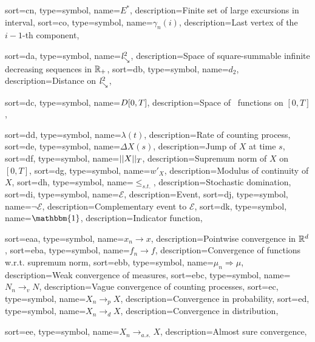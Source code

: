 {
	sort={cn},
	type=symbol,
	name={$E^*$},
	description={Finite set of large excursions in interval, \pageref{L: Deterministic Lemma}}
}
{
	sort={co},
	type=symbol,
name={$\gamma_n(i)$},
description={Last vertex of the $i-1$-th component, \pageref{L: Lemma 8}}
}


{
	sort={da},
	type=symbol,
	name={$\mathit{l}^2_{\searrow}$},
	description={Space of square-summable infinite decreasing sequences in $\mathbb{R}_+$, \pageref{D: ld}}
}
{
	sort={db},
	type=symbol,
	name={$d_2$},
	description={Distance on $\mathit{l}^2_{\searrow}$, \pageref{D: ld}}
}

{
	sort={dc},
	type=symbol,
name={$D[0, T]$},
description={Space of \cadlag~functions on $[0,T]$, \pageref{D: DT}}
}

{
	sort={dd},
	type=symbol,
name={$\lambda(t)$},
description={Rate of counting process, \pageref{D: def gamma(A)}}
}
{
	sort={de},
	type=symbol,
name={$\Delta X(s)$},
description={Jump of $X$ at time $s$, \pageref{I: DeltaX}}
}
{
	sort={df},
	type=symbol,
name={$||X||_T$},
description={Supremum norm of $X$ on $[0,T]$, \pageref{I: supnorm}}
}
{
	sort={dg},
	type=symbol,
	name={$w'_X$},
	description={Modulus of continuity of $X$, \pageref{D: modulus of continuity}}
}
{
	sort={dh},
	type=symbol,
	name={$\leq_{s.t.}$},
	description={Stochastic domination, \pageref{E: stoch dom.}}
}
{
sort={di},
type=symbol,
name={$\mathcal{E}$},
description={Event, \pageref{E: First Total Probability Argument}}
}
{
sort={dj},
type=symbol,
name={$\neg\mathcal{E}$},
description={Complementary event to $\mathcal{E}$, \pageref{E: First Total Probability Argument}}
}
{
sort={dk},
type=symbol,
name={$\mathbbm{1}$},
description={Indicator function, \pageref{E: def Z}}
}


{
	sort={eaa},
	type=symbol,
	name={$x_n \rightarrow x$},
	description={Pointwise convergence in $\mathbb{R}^d$, \pageref{T: folk theorem}}
}
{
	sort={eba},
	type=symbol,
	name={$f_n \rightarrow f$},
	description={Convergence of functions w.r.t. supremum norm, \pageref{L: Deterministic Lemma}}
}
{
sort={ebb},
type=symbol,
name={$\mu_n \Rightarrow \mu$},
description={Weak convergence of measures, \pageref{D: weak convergence}}
}
{
sort={ebc},
type=symbol,
name={$N_n \rightarrow_v N$},
description={Vague convergence of counting processes, \pageref{D: vague convergence}}
}
{
	sort={ec},
	type=symbol,
	name={$X_n \rightarrow_p X$},
	description={Convergence in probability, \pageref{I: conv prob}}
}
{
	sort={ed},
	type=symbol,
	name={$X_n \rightarrow_d X$},
	description={Convergence in distribution, \pageref{D: weak convergence}}
}

{
	sort={ee},
	type=symbol,
	name={$X_n \rightarrow_{a.s.} X$},
	description={Almost sure convergence, \pageref{T: Skorohod}}
}
